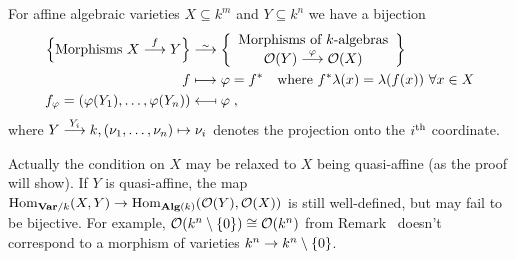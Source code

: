 \documentclass[a4paper,parskip=half,numbers=enddot, DIV=12]{scrreprt}
\begin{document}
	\begin{prop} For affine algebraic varieties $X\subseteq k^m$ and $Y\subseteq k^n$ we have a bijection%
		\begin{align*}
			\left\{\text{Morphisms }X\morphism[f]Y\right\}&\isomorphism\left\{\begin{array}{c}
			\text{{Morphisms of }}k\text{-algebras}\\
			\Oo(Y)\morphism[\phi]\Oo(X)
			\end{array}\right\}\\
			f&\longmapsto\phi=f^*\quad\text{where }f^*\lambda(x)=\lambda(f(x))\ \forall x\in X\\
			f_\phi=\left(\phi(Y_1),\ldots,\phi(Y_n)\right)&\longmapsfrom\phi\;,
		\end{align*}
		where $Y\morphism[Y_i]k,(\nu_1,\ldots,\nu_n)\mapsto\nu_i$ denotes the projection onto the $i^{\text{th}}$ coordinate.
	\end{prop}
	\begin{rem*}
		Actually the condition on $X$ may be relaxed to $X$ being quasi-affine (as the proof will show). If $Y$ is quasi-affine, the map $\Hom_{\cat{Var}/k}(X,Y)\morphism \Hom_{\cat{Alg}(k)}(\Oo(Y),\Oo(X))$ is still well-defined, but may fail to be bijective. For example, $\mathcal{O}(k^n\setminus\{0\})\cong \mathcal{O}(k^n)$ from Remark~ doesn't correspond to a morphism of varieties $k^n\morphism k^n\setminus\{0\}$.%
	\end{rem*}
\end{document}
